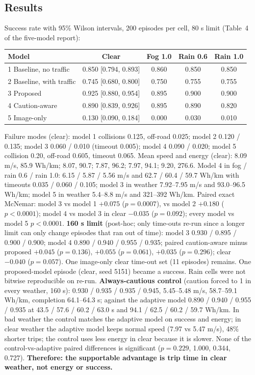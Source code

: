 \documentclass[10.5pt,a4paper]{article}
\begin{document}
\subsection{Results}
Success rate with 95\% Wilson intervals, 200 episodes per cell, 80 s limit (Table~4 of the five-model report):
\begin{center}\footnotesize\setlength{\tabcolsep}{3pt}\begin{tabular}{@{}lcccc@{}}\toprule
Model & Clear & Fog 1.0 & Rain 0.6 & Rain 1.0\\\midrule
1 Baseline, no traffic & 0.850 [0.794, 0.893] & 0.860 & 0.850 & 0.850\\
2 Baseline, with traffic & 0.745 [0.680, 0.800] & 0.750 & 0.755 & 0.755\\
3 Proposed & 0.925 [0.880, 0.954] & 0.895 & 0.900 & 0.900\\
4 Caution-aware & 0.890 [0.839, 0.926] & 0.895 & 0.890 & 0.820\\
5 Image-only & 0.130 [0.090, 0.184] & 0.000 & 0.030 & 0.010\\\bottomrule\end{tabular}\end{center}
Failure modes (clear): model 1 collisions 0.125, off-road 0.025; model 2 0.120 / 0.135; model 3 0.060 / 0.010 (timeout 0.005); model 4 0.090 / 0.020; model 5 collision 0.20, off-road 0.605, timeout 0.065. Mean speed and energy (clear): 8.09 m/s, 85.9 Wh/km; 8.07, 90.7; 7.87, 96.2; 7.97, 94.1; 9.20, 276.6. Model 4 in fog / rain 0.6 / rain 1.0: 6.15 / 5.87 / 5.56 m/s and 62.7 / 60.4 / 59.7 Wh/km with timeouts 0.035 / 0.060 / 0.105; model 3 in weather 7.92--7.95 m/s and 93.0--96.5 Wh/km; model 5 in weather 5.4--8.8 m/s and 321--392 Wh/km. Paired exact McNemar: model 3 vs model 1 $+0.075$ ($p=0.0007$), vs model 2 $+0.180$ ($p<0.0001$); model 4 vs model 3 in clear $-0.035$ ($p=0.092$); every model vs model 5 $p<0.0001$.
\textbf{160 s limit} (post-hoc; only time-outs re-run since a longer limit can only change episodes that ran out of time): model 3 0.930 / 0.895 / 0.900 / 0.900; model 4 0.890 / 0.940 / 0.955 / 0.935; paired caution-aware minus proposed $+0.045$ ($p=0.136$), $+0.055$ ($p=0.061$), $+0.035$ ($p=0.296$); clear $-0.040$ ($p=0.057$). One image-only clear time-out set (11 episodes) remains. One proposed-model episode (clear, seed 5151) became a success. Rain cells were not bitwise reproducible on re-run.
\textbf{Always-cautious control} (caution forced to 1 in every weather, 160 s): 0.930 / 0.935 / 0.935 / 0.945, 5.45--5.48 m/s, 58.7--59.1 Wh/km, completion 64.1--64.3 s; against the adaptive model 0.890 / 0.940 / 0.955 / 0.935 at 43.5 / 57.6 / 60.2 / 63.0 s and 94.1 / 62.5 / 60.2 / 59.7 Wh/km. In bad weather the control matches the adaptive model on success and energy; in clear weather the adaptive model keeps normal speed (7.97 vs 5.47 m/s), 48\% shorter trips; the control uses less energy in clear because it is slower. None of the control-vs-adaptive paired differences is significant ($p=0.229$, 1.000, 0.344, 0.727). \textbf{Therefore: the supportable advantage is trip time in clear weather, not energy or success.}
\end{document}
